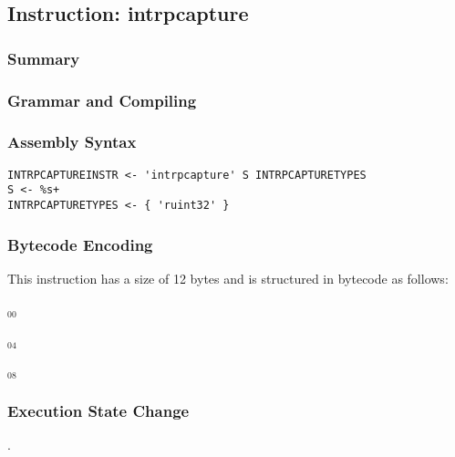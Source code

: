 \subsection{Instruction: intrpcapture}

\subsubsection{Summary}


\subsubsection{Grammar and Compiling}


\subsubsection{Assembly Syntax}

\begin{myquote}
\begin{verbatim}
INTRPCAPTUREINSTR <- 'intrpcapture' S INTRPCAPTURETYPES
S <- %s+
INTRPCAPTURETYPES <- { 'ruint32' }
\end{verbatim}
\end{myquote}


\subsubsection{Bytecode Encoding}

This instruction has a size of 12 bytes and is structured in bytecode as follows:

$_{00}$\ 



$_{04}$\ 



$_{08}$\ 
\fbox{%
  \parbox{20pt}{%
00
  }%
}


\subsubsection{Execution State Change}

.


